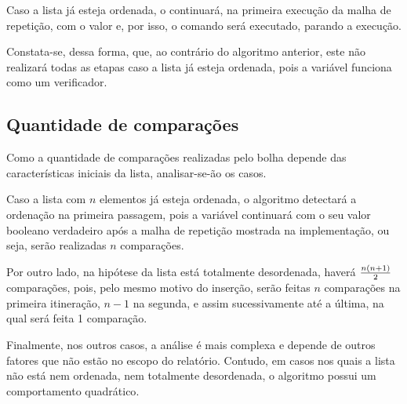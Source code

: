 Caso a lista já esteja ordenada, o  continuará, na primeira execução da malha de repetição, com o valor  e, por isso, o comando  será executado, parando a execução.

Constata-se, dessa forma, que, ao contrário do algoritmo anterior, este não realizará todas as etapas caso a lista já esteja ordenada, pois a variável\linebreak {} funciona como um verificador.

\subsection{Quantidade de comparações}
Como a quantidade de comparações realizadas pelo bolha depende das características iniciais da lista, analisar-se-ão os casos. 

Caso a lista com $n$ elementos já esteja ordenada, o algoritmo detectará a ordenação na primeira passagem, pois a variável  continuará com o seu valor booleano verdadeiro após a malha de repetição mostrada na implementação, ou seja, serão realizadas $n$ comparações.

Por outro lado, na hipótese da lista está totalmente desordenada, haverá $n(n+1)\over 2$ comparações, pois, pelo mesmo motivo do inserção, serão feitas $n$ comparações na primeira itineração, $n-1$ na segunda, e assim sucessivamente até a última, na qual será feita 1 comparação.

Finalmente, nos outros casos, a análise é mais complexa e depende de outros fatores que não estão no escopo do relatório. Contudo, em casos nos quais a lista não está nem ordenada, nem totalmente desordenada, o algoritmo possui um comportamento quadrático\cite{bubblecomplexity}.